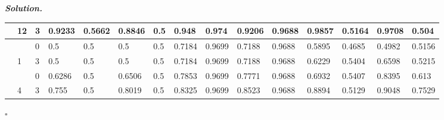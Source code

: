 \documentclass[10pt]{article}
\newenvironment{solution}[1][\it{Solution}]{\textbf{#1. } }{$\square$}
\begin{document}
\begin{solution}
\begin{table}[H]
\begin{tabular}{|l|l|l|l|l|l|l|l|l|l|l|l|l|l|l|}
\rowcolor[HTML]{EFEFEF} 
\multirow{-6}{*}{\cellcolor[HTML]{32CB00}1000}  & \multirow{-2}{*}{\cellcolor[HTML]{FFCCC9}12} & \cellcolor[HTML]{F8A102}3                    & 0.9233                         & 0.5662                         & 0.8846                         & 0.5                            & \cellcolor[HTML]{C0C0C0}0.948  & \cellcolor[HTML]{C0C0C0}0.974  & \cellcolor[HTML]{C0C0C0}0.9206 & \cellcolor[HTML]{C0C0C0}0.9688 & 0.9857                         & 0.5164                         & 0.9708                         & 0.504                          \\ \hline
\rowcolor[HTML]{C0C0C0} 
\cellcolor[HTML]{009901}                        & \cellcolor[HTML]{FE0000}                     & \cellcolor[HTML]{FFCE93}0                    & 0.5                            & 0.5                            & 0.5                            & 0.5                            & \cellcolor[HTML]{EFEFEF}0.7184 & \cellcolor[HTML]{EFEFEF}0.9699 & \cellcolor[HTML]{EFEFEF}0.7188 & \cellcolor[HTML]{EFEFEF}0.9688 & 0.5895                         & 0.4685                         & 0.4982                         & 0.5156                         \\ \cline{3-15} 
\rowcolor[HTML]{EFEFEF} 
\cellcolor[HTML]{009901}                        & \multirow{-2}{*}{\cellcolor[HTML]{FE0000}1}  & \cellcolor[HTML]{F8A102}3                    & 0.5                            & 0.5                            & 0.5                            & 0.5                            & \cellcolor[HTML]{C0C0C0}0.7184 & \cellcolor[HTML]{C0C0C0}0.9699 & \cellcolor[HTML]{C0C0C0}0.7188 & \cellcolor[HTML]{C0C0C0}0.9688 & 0.6229                         & 0.5404                         & 0.6598                         & 0.5215                         \\ \cline{2-15} 
\rowcolor[HTML]{C0C0C0} 
\cellcolor[HTML]{009901}                        & \cellcolor[HTML]{FD6864}                     & \cellcolor[HTML]{FFCE93}0                    & 0.6286                         & 0.5                            & 0.6506                         & 0.5                            & \cellcolor[HTML]{EFEFEF}0.7853 & \cellcolor[HTML]{EFEFEF}0.9699 & \cellcolor[HTML]{EFEFEF}0.7771 & \cellcolor[HTML]{EFEFEF}0.9688 & 0.6932                         & 0.5407                         & 0.8395                         & 0.613                          \\ \cline{3-15} 
\rowcolor[HTML]{EFEFEF} 
\cellcolor[HTML]{009901}                        & \multirow{-2}{*}{\cellcolor[HTML]{FD6864}4}  & \cellcolor[HTML]{F8A102}3                    & 0.755                          & 0.5                            & 0.8019                         & 0.5                            & \cellcolor[HTML]{C0C0C0}0.8325 & \cellcolor[HTML]{C0C0C0}0.9699 & \cellcolor[HTML]{C0C0C0}0.8523 & \cellcolor[HTML]{C0C0C0}0.9688 & 0.8894                         & 0.5129                         & 0.9048                         & 0.7529                         \\ \cline{2-15} 

\end{tabular}
\end{table}
\end{solution}
\end{document}
